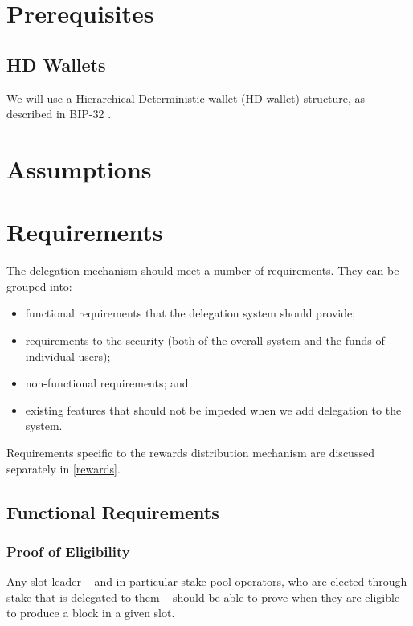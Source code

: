 \documentclass[11pt,a4paper]{article}
\begin{document}
\section{Prerequisites}
\label{prerequisites}

\subsection{HD Wallets}
\label{hd-wallets}

We will use a Hierarchical Deterministic wallet (HD wallet) structure,
as described in BIP-32 \citep{bip32}.

\section{Assumptions}
\label{assumptions}

\section{Requirements}
\label{requirements}

The delegation mechanism should meet a number of requirements. They can
be grouped into:

\begin{itemize}
\item
  functional requirements that the delegation system should provide;
\item
  requirements to the security (both of the overall system and the funds
  of individual users);
\item
  non-functional requirements; and
\item
  existing features that should not be impeded when we add delegation to
  the system.
\end{itemize}

Requirements specific to the rewards distribution mechanism are
discussed separately in \cref{rewards}.

\subsection{Functional Requirements}
\label{functional-requirements}

\subsubsection{Proof of Eligibility}
\label{proof-of-eligibility}

Any slot leader -- and in particular stake pool operators, who are
elected through stake that is delegated to them -- should be able to
prove when they are eligible to produce a block in a given slot.
\end{document}
